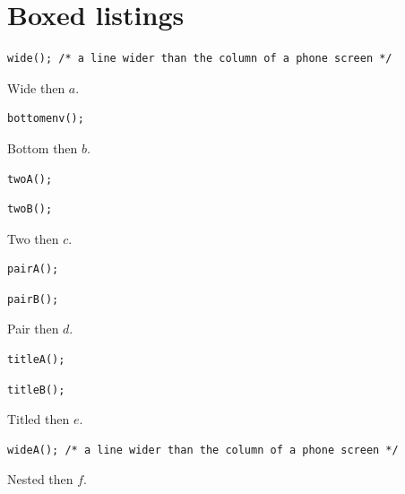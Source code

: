 \documentclass{article}
\begin{document}
\section{Boxed listings}
\begin{lrbox}{\lstbox}\begin{lstlisting}
wide(); /* a line wider than the column of a phone screen */
\end{lstlisting}\end{lrbox}
Wide \fbox{\usebox{\lstbox}} then $a$.

\begin{lrbox}{\lstbox}\begin{lstlisting}[caption={Below env},captionpos=b]
bottomenv();
\end{lstlisting}\end{lrbox}
Bottom \fbox{\usebox{\lstbox}} then $b$.

\begin{lrbox}{\lstbox}\begin{lstlisting}
twoA();
\end{lstlisting}\begin{lstlisting}[caption={Above second}]
twoB();
\end{lstlisting}\end{lrbox}
Two \fbox{\usebox{\lstbox}} then $c$.

\begin{lrbox}{\lstbox}\begin{lstlisting}[caption={Below first},captionpos=b]
pairA();
\end{lstlisting}\begin{lstlisting}[caption={Above next}]
pairB();
\end{lstlisting}\end{lrbox}
Pair \fbox{\usebox{\lstbox}} then $d$.

\begin{lrbox}{\lstbox}\begin{lstlisting}
titleA();
\end{lstlisting}\begin{lstlisting}[title={Titled next}]
titleB();
\end{lstlisting}\end{lrbox}
Titled \fbox{\usebox{\lstbox}} then $e$.

\begin{lrbox}{\lstbox}\begin{lstlisting}
wideA(); /* a line wider than the column of a phone screen */
\end{lstlisting}\end{lrbox}
Nested \fbox{\fbox{\usebox{\lstbox}}} then $f$.
\end{document}
